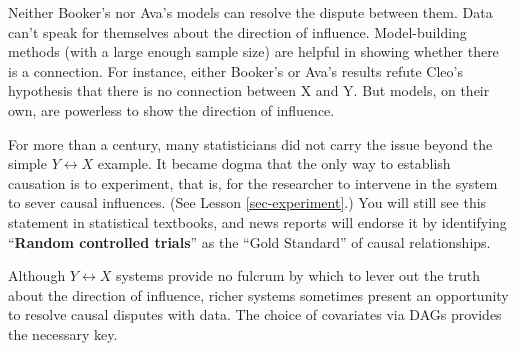 \documentclass[
  letterpaper,
  DIV=11,
  numbers=noendperiod,
  oneside]{scrartcl}
\begin{document}
Neither Booker's nor Ava's models can resolve the dispute between them.
Data can't speak for themselves about the direction of influence.
Model-building methods (with a large enough sample size) are helpful in
showing whether there is a connection. For instance, either Booker's or
Ava's results refute Cleo's hypothesis that there is no connection
between X and Y. But models, on their own, are powerless to show the
direction of influence.

For more than a century, many statisticians did not carry the issue
beyond the simple \(Y \leftrightarrow X\) example. It became dogma that
the only way to establish causation is to experiment, that is, for the
researcher to intervene in the system to sever causal influences. (See
Lesson \ref{sec-experiment}.) You will still see this statement in
statistical textbooks, and news reports will endorse it by identifying
``\textbf{Random controlled trials}'' as the ``Gold Standard'' of causal
relationships. {}

Although \(Y \leftrightarrow X\) systems provide no fulcrum by which to
lever out the truth about the direction of influence, richer systems
sometimes present an opportunity to resolve causal disputes with data.
The choice of covariates via DAGs provides the necessary key.
\end{document}
